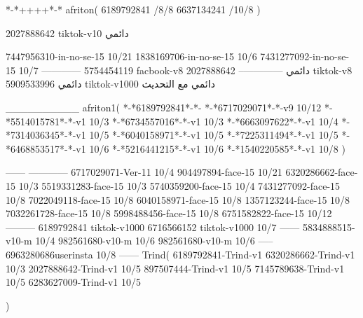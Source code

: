 *-*++++*-*
afriton(
6189792841 /8/8
6637134241 /10/8
)

2027888642 tiktok-v10
دائمي


7447956310-in-no-se-15 10/21
1838169706-in-no-se-15 10/6
7431277092-in-no-se-15 10/7
------------
5754454119 facbook-v8
دائمي
--------------
2027888642 tiktok-v8
دائمي
5909533996 tiktok-v1000
دائمي مع التحديث

__________
afriton1(
*-*6189792841*-*-
*-*6717029071*-*-v9 10/12
*-*5514015781*-*-v1 10/3
*-*6734557016*-*-v1 10/3
*-*6663097622*-*-v1 10/4
*-*7314036345*-*-v1 10/5
*-*6040158971*-*-v1 10/5
*-*7225311494*-*-v1 10/5
*-*6468853517*-*-v1 10/6
*-*5216441215*-*-v1 10/6
*-*1540220585*-*-v1 10/8
)

------
------------
6717029071-Ver-11
10/4
904497894-face-15 10/21
6320286662-face-15 10/3
5519331283-face-15 10/3
5740359200-face-15 10/4
7431277092-face-15 10/8
7022049118-face-15 10/8
6040158971-face-15 10/8
1357123244-face-15 10/8
7032261728-face-15 10/8
5998488456-face-15 10/8
6751582822-face-15 10/12
---------
6189792841 tiktok-v1000
6716566152 tiktok-v1000
10/7
------
5834888515-v10-m 10/4
982561680‏-v10-m 10/6
982561680-v10-m 10/6
-----
6963280686userinsta 10/8
------
Trind(
6189792841-Trind-v1 
6320286662-Trind-v1 10/3
2027888642-Trind-v1 10/5
897507444-Trind-v1 10/5
7145789638-Trind-v1 10/5
6283627009-Trind-v1 10/5

)
